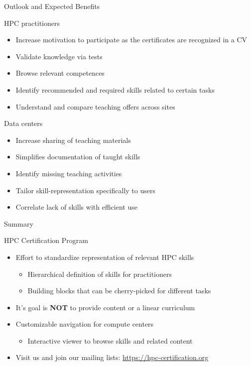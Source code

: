 \documentclass[compress,aspectratio=169]{beamer}
\begin{document}
\begin{frame}{Outlook and Expected Benefits}
	\begin{block}{HPC practitioners}
		\vspace*{-0.2cm}
	\begin{itemize}
	\item Increase motivation to participate as the certificates are recognized in a CV
	\item Validate knowledge via tests
	\item Browse relevant competences
	\item Identify recommended and required skills related to certain tasks
	\item Understand and compare teaching offers across sites
	\end{itemize}
	\end{block}
	\vspace*{-0.3cm}
	\begin{block}{Data centers}
		\vspace*{-0.2cm}
	\begin{itemize}
	\item Increase sharing of teaching materials
	\item Simplifies documentation of taught skills
	\item Identify missing teaching activities
	\item Tailor skill-representation specifically to users
	\item Correlate lack of skills with efficient use
	\end{itemize}
	\end{block}
\end{frame}


\begin{frame}{Summary}

	\begin{block}{HPC Certification Program}
		\begin{itemize}
			\item Effort to standardize representation of relevant HPC skills
      \begin{itemize}
        \item Hierarchical definition of skills for practitioners
        \item Building blocks that can be cherry-picked for different tasks
      \end{itemize}
      \item It's goal is \textbf{NOT} to provide content or a linear curriculum
			\item Customizable navigation for compute centers
      \begin{itemize}
        \item Interactive viewer to browse skills and related content
      \end{itemize}
      \item Visit us and join our mailing lists: \url{https://hpc-certification.org}
		\end{itemize}
	\end{block}
\end{frame}
\end{document}
